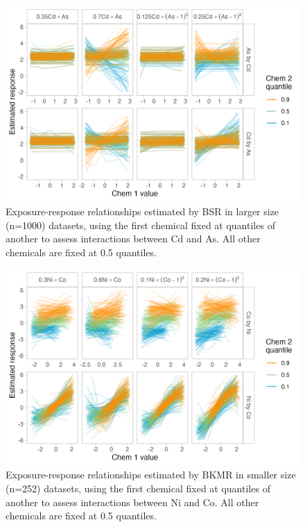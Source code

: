 \documentclass[12pt, twoside]{amherstthesis}
\begin{document}
\begin{figure}

{\centering \includegraphics[width=0.85\linewidth]{figures/ch4_slg_biv_expresp_2} 

}

\caption{Exposure-response relationships estimated by BSR in larger size (n=1000) datasets, using the first chemical fixed at quantiles of another to assess interactions between Cd and As. All other chemicals are fixed at 0.5 quantiles.}\label{fig:slgcdas}
\end{figure}
\begin{figure}

{\centering \includegraphics[width=0.85\linewidth]{figures/ch4_ksm_biv_expresp_3} 

}

\caption{Exposure-response relationships estimated by BKMR in smaller size (n=252) datasets, using the first chemical fixed at quantiles of another to assess interactions between Ni and Co. All other chemicals are fixed at 0.5 quantiles.}\label{fig:ksmnico}
\end{figure}
\end{document}
